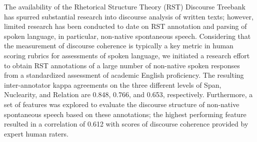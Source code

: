 The availability of the Rhetorical Structure Theory (RST) Discourse Treebank has spurred substantial research into discourse analysis of written texts; however, limited research has been conducted to date on RST annotation and parsing of spoken language, in particular, non-native spontaneous speech. Considering that the measurement of discourse coherence is typically a key metric in human scoring rubrics for assessments of spoken language, we initiated a research effort to obtain RST annotations of a large number of non-native spoken responses from a standardized assessment of academic English proficiency. The resulting inter-annotator kappa agreements on the three different levels of Span, Nuclearity, and Relation are 0.848, 0.766, and 0.653, respectively. Furthermore, a set of features was explored to evaluate the discourse structure of non-native spontaneous speech based on these annotations; the highest performing feature resulted in a correlation of 0.612 with scores of discourse coherence provided by expert human raters.
